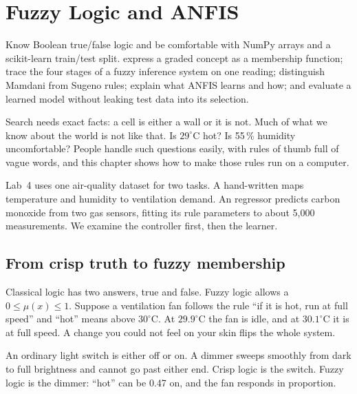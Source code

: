 \chapter{Fuzzy Logic and ANFIS}
\label{ch:fuzzy}

\chapterguide%
  {Know Boolean true/false logic and be comfortable with NumPy arrays and a scikit-learn train/test split.}
  {express a graded concept as a membership function; trace the four stages of a fuzzy inference system on one reading; distinguish Mamdani from Sugeno rules; explain what ANFIS learns and how; and evaluate a learned model without leaking test data into its selection.}

Search needs exact facts: a cell is either a wall or it is not. Much of what we know about the world is not like that. Is $29^\circ$C hot? Is 55\,\% humidity uncomfortable? People handle such questions easily, with rules of thumb full of vague words, and this chapter shows how to make those rules run on a computer.

Lab~4 uses one air-quality dataset for two tasks. A hand-written  maps temperature and humidity to ventilation demand. An  regressor predicts carbon monoxide from two gas sensors, fitting its rule parameters to about 5,000 measurements. We examine the controller first, then the learner.

\section{From crisp truth to fuzzy membership}

Classical logic has two answers, true and false. Fuzzy logic allows a  $0\le\mu(x)\le1$. Suppose a ventilation fan follows the rule ``if it is hot, run at full speed'' and ``hot'' means above $30^\circ$C. At $29.9^\circ$C the fan is idle, and at $30.1^\circ$C it is at full speed. A change you could not feel on your skin flips the whole system.

\begin{analogy}
An ordinary light switch is either off or on. A dimmer sweeps smoothly from dark to full brightness and cannot go past either end. Crisp logic is the switch. Fuzzy logic is the dimmer: ``hot'' can be 0.47 on, and the fan responds in proportion.
\end{analogy}

